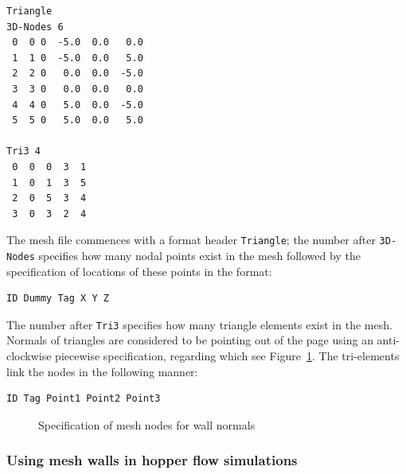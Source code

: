 \begin{verbatim}
Triangle
3D-Nodes 6
 0  0 0  -5.0  0.0   0.0
 1  1 0  -5.0  0.0   5.0
 2  2 0   0.0  0.0  -5.0
 3  3 0   0.0  0.0   0.0
 4  4 0   5.0  0.0  -5.0
 5  5 0   5.0  0.0   5.0

Tri3 4
 0  0  0  3  1
 1  0  1  3  5
 2  0  5  3  4
 3  0  3  2  4
\end{verbatim}

The mesh file commences with a format header \texttt{Triangle}; the number after \texttt{3D-\+Nodes} specifies how many nodal points exist in the mesh followed by the specification of locations of these points in the format:
\begin{verbatim}
ID Dummy Tag X Y Z
\end{verbatim}

The number after \texttt{Tri3} specifies how many triangle elements exist in the mesh. Normals of triangles are considered to be pointing out of the page using an                                                         anti-clockwise piecewise specification, regarding which see Figure~\ref{fig:trimesh_normal}. The tri-elements link the nodes in the following manner:
\begin{verbatim}
ID Tag Point1 Point2 Point3
\end{verbatim}

\begin{figure}
\begin{center}
\end{center}
\caption{Specification of mesh nodes for wall normals} \label{fig:trimesh_normal}
\end{figure}

\subsubsection{Using mesh walls in hopper flow simulations}

